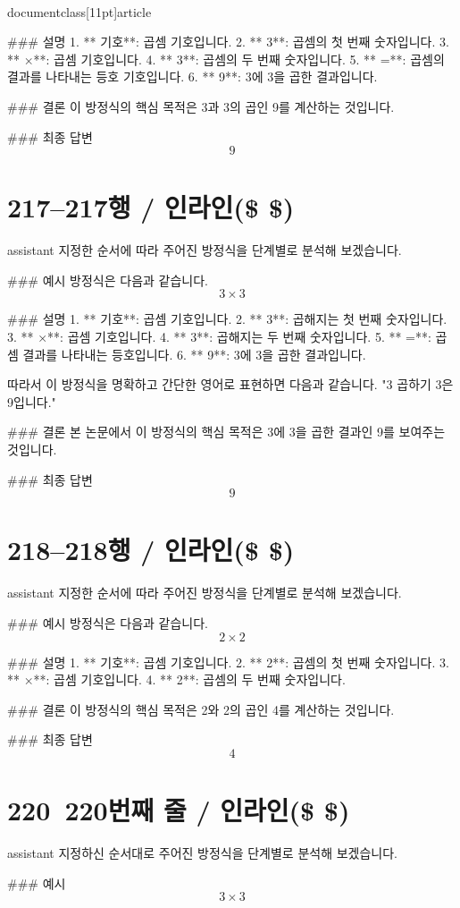 \\documentclass[11pt]{article}
\begin{document}
### 설명
1. ** 기호**: 곱셈 기호입니다.
2. ** 3**: 곱셈의 첫 번째 숫자입니다.
3. ** ×**: 곱셈 기호입니다.
4. ** 3**: 곱셈의 두 번째 숫자입니다.
5. ** =**: 곱셈의 결과를 나타내는 등호 기호입니다.
6. ** 9**: 3에 3을 곱한 결과입니다.

### 결론
이 방정식의 핵심 목적은 3과 3의 곱인 9를 계산하는 것입니다.

### 최종 답변
\[
\boxed{9}
\]

\section*{217–217행 / 인라인(\$ \$) }
assistant
지정한 순서에 따라 주어진 방정식을 단계별로 분석해 보겠습니다.

### 예시
방정식은 다음과 같습니다.
\[ 3 \times 3 \]

### 설명
1. ** 기호**: 곱셈 기호입니다.
2. ** 3**: 곱해지는 첫 번째 숫자입니다.
3. ** ×**: 곱셈 기호입니다.
4. ** 3**: 곱해지는 두 번째 숫자입니다.
5. ** =**: 곱셈 결과를 나타내는 등호입니다.
6. ** 9**: 3에 3을 곱한 결과입니다.

따라서 이 방정식을 명확하고 간단한 영어로 표현하면 다음과 같습니다.
"3 곱하기 3은 9입니다."

### 결론
본 논문에서 이 방정식의 핵심 목적은 3에 3을 곱한 결과인 9를 보여주는 것입니다.

### 최종 답변
\[
\boxed{9}
\]

\section*{218–218행 / 인라인(\$ \$) }
assistant
지정한 순서에 따라 주어진 방정식을 단계별로 분석해 보겠습니다.

### 예시
방정식은 다음과 같습니다.
\[ 2 \times 2 \]

### 설명
1. ** 기호**: 곱셈 기호입니다.
2. ** 2**: 곱셈의 첫 번째 숫자입니다.
3. ** ×**: 곱셈 기호입니다.
4. ** 2**: 곱셈의 두 번째 숫자입니다.

### 결론
이 방정식의 핵심 목적은 2와 2의 곱인 4를 계산하는 것입니다.

### 최종 답변
\[
\boxed{4}
\]

\section*{220~220번째 줄 / 인라인(\$ \$) }
assistant
지정하신 순서대로 주어진 방정식을 단계별로 분석해 보겠습니다.

### 예시
\[ 3 \times 3 \]
\end{document}
